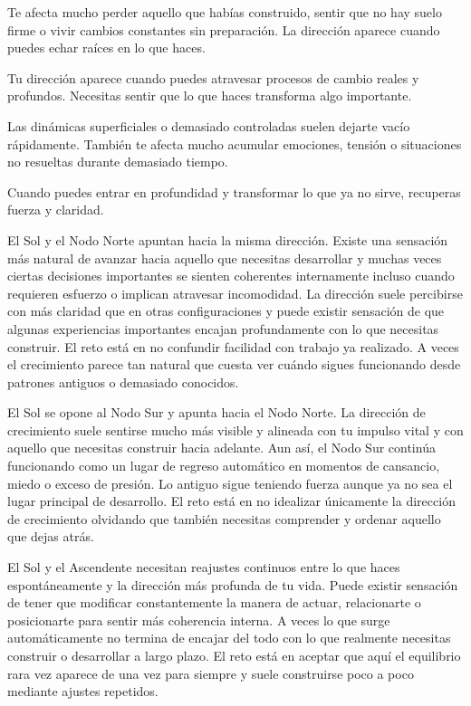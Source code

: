 \documentclass[11pt,a4paper]{article}
\begin{document}
Te afecta mucho perder aquello que habías construido, sentir que no hay suelo firme o vivir cambios constantes sin preparación. La dirección aparece cuando puedes echar raíces en lo que haces.

Tu dirección aparece cuando puedes atravesar procesos de cambio reales y profundos. Necesitas sentir que lo que haces transforma algo importante.

Las dinámicas superficiales o demasiado controladas suelen dejarte vacío rápidamente. También te afecta mucho acumular emociones, tensión o situaciones no resueltas durante demasiado tiempo.

Cuando puedes entrar en profundidad y transformar lo que ya no sirve, recuperas fuerza y claridad.

El Sol y el Nodo Norte apuntan hacia la misma dirección. Existe una sensación más natural de avanzar hacia aquello que necesitas desarrollar y muchas veces ciertas decisiones importantes se sienten coherentes internamente incluso cuando requieren esfuerzo o implican atravesar incomodidad. La dirección suele percibirse con más claridad que en otras configuraciones y puede existir sensación de que algunas experiencias importantes encajan profundamente con lo que necesitas construir. El reto está en no confundir facilidad con trabajo ya realizado. A veces el crecimiento parece tan natural que cuesta ver cuándo sigues funcionando desde patrones antiguos o demasiado conocidos.

El Sol se opone al Nodo Sur y apunta hacia el Nodo Norte. La dirección de crecimiento suele sentirse mucho más visible y alineada con tu impulso vital y con aquello que necesitas construir hacia adelante. Aun así, el Nodo Sur continúa funcionando como un lugar de regreso automático en momentos de cansancio, miedo o exceso de presión. Lo antiguo sigue teniendo fuerza aunque ya no sea el lugar principal de desarrollo. El reto está en no idealizar únicamente la dirección de crecimiento olvidando que también necesitas comprender y ordenar aquello que dejas atrás.

El Sol y el Ascendente necesitan reajustes continuos entre lo que haces espontáneamente y la dirección más profunda de tu vida. Puede existir sensación de tener que modificar constantemente la manera de actuar, relacionarte o posicionarte para sentir más coherencia interna. A veces lo que surge automáticamente no termina de encajar del todo con lo que realmente necesitas construir o desarrollar a largo plazo. El reto está en aceptar que aquí el equilibrio rara vez aparece de una vez para siempre y suele construirse poco a poco mediante ajustes repetidos.
\end{document}
